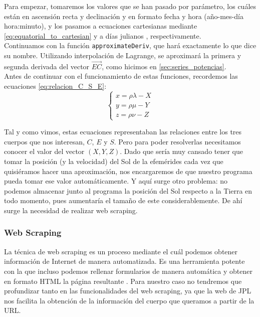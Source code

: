 \documentclass[11pt]{book}
\begin{document}
Para empezar, tomaremos los valores que se han pasado por parámetro, los cuáles están en ascensión recta y declinación y en formato fecha y hora (año-mes-día hora:minuto), y los pasamos a ecuaciones cartesianas mediante \eqref{eq:equatorial_to_cartesian} y a días julianos \cite{julian}, respectivamente.\\

Continuamos con la función \texttt{approximateDeriv}, que hará exactamente lo que dice su nombre. Utilizando interpolación de Lagrange, se aproximará la primera y segunda derivada del vector $\overrightarrow{EC}$, como hicimos en \ref{sec:series_potencias}.\\

Antes de continuar con el funcionamiento de estas funciones, recordemos las ecuaciones \eqref{eq:relacion_C_S_E}:
\[
\left\{
\begin{array}{l}
	x=\rho\lambda-X\\
	y=\rho\mu-Y\\
	z=\rho\nu-Z
\end{array}
\right.
\]

Tal y como vimos, estas ecuaciones representaban las relaciones entre los tres cuerpos que nos interesan, $C$, $E$ y $S$. Pero para poder resolverlas necesitamos conocer el valor del vector $(X,Y,Z)$. Dado que sería muy cansado tener que tomar la posición (y la velocidad) del Sol de la efemérides cada vez que quisiéramos hacer una aproximación, nos encargaremos de que nuestro programa pueda tomar ese valor automáticamente. Y aquí surge otro problema: no podemos almacenar junto al programa la posición del Sol respecto a la Tierra en todo momento, pues aumentaría el tamaño de este considerablemente. De ahí surge la necesidad de realizar web scraping.\\

\subsubsection{Web Scraping}
La técnica de web scraping es un proceso mediante el cuál podemos obtener información de Internet de manera automatizada. Es una herramienta potente con la que incluso podemos rellenar formularios de manera automática y obtener en formato HTML la página resultante \cite{webscraping}. Para nuestro caso no tendremos que profundizar tanto en las funcionalidades del web scraping, ya que la web de JPL \cite{jpl} nos facilita la obtención de la información del cuerpo que queramos a partir de la URL.\\
\end{document}

